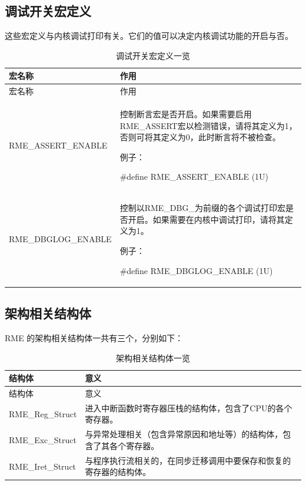 \subsection{调试开关宏定义}\label{subsec:7-debug-switch-macro-definitions}

这些宏定义与内核调试打印有关。它们的值可以决定内核调试功能的开启与否。

\begin{xltabular}{\textwidth}{@{}>{\hsize\raggedright\arraybackslash}X>{\hsize\raggedright\arraybackslash}X@{}}
\caption{调试开关宏定义一览}\label{tab:7-4-debug-switch-macro-definitions-overview}\\
\toprule
宏名称 & 作用\tabularnewline
\endfirsthead
\toprule
宏名称 & 作用\tabularnewline
\midrule
\endhead
\bottomrule
\endlastfoot
RME\_ASSERT\_ENABLE\strut
 & 控制断言宏是否开启。如果需要启用RME\_ASSERT宏以检测错误，请将其定义为1，否则可将其定义为0，此时断言将不被检查。

例子：

\#define RME\_ASSERT\_ENABLE (1U)\strut
\tabularnewline
RME\_DBGLOG\_ENABLE\strut
 & 控制以RME\_DBG\_为前缀的各个调试打印宏是否开启。如果需要在内核中调试打印，请将其定义为1。

例子：

\#define RME\_DBGLOG\_ENABLE (1U)\strut
\tabularnewline
\end{xltabular}

\subsection{架构相关结构体}\label{subsec:7-architecture-dependent-structs}

RME 的架构相关结构体一共有三个，分别如下：

\begin{xltabular}{\textwidth}{@{}>{\hsize\raggedright\arraybackslash}X>{\hsize\raggedright\arraybackslash}X@{}}
\caption{架构相关结构体一览}\label{tab:7-5-architecture-dependent-structs-overview}\\
\toprule
结构体 & 意义\tabularnewline
\endfirsthead
\toprule
结构体 & 意义\tabularnewline
\midrule
\endhead
\bottomrule
\endlastfoot
RME\_Reg\_Struct &
进入中断函数时寄存器压栈的结构体，包含了CPU的各个寄存器。\tabularnewline
RME\_Exc\_Struct &
与异常处理相关（包含异常原因和地址等）的结构体，包含了其各个寄存器。\tabularnewline
RME\_Iret\_Struct &
与程序执行流相关的，在同步迁移调用中要保存和恢复的寄存器的结构体。\tabularnewline
\end{xltabular}

